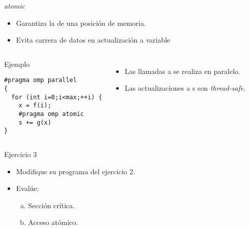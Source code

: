 \begin{frame}[t,fragile]{\emph{atomic}}
\begin{itemize}
  \item Garantiza la  de una posición de memoria.
  \item Evita carrera de datos en actualización a variable
\end{itemize}

\begin{columns}

\begin{block}{Ejemplo}
\begin{lstlisting}
#pragma omp parallel
{
  for (int i=0;i<max;++i) {
    x = f(i);
    #pragma omp atomic
    s += g(x)
}
\end{lstlisting}
\end{block}

\begin{itemize}
  \item Las llamadas a  se realiza en paralelo.
  \item Las actualizaciones a s son \emph{thread-safe}.
\end{itemize}

\end{columns}
\end{frame}

\begin{frame}[t]{Ejercicio 3}
\begin{itemize}
  \item Modifique su programa del ejercicio 2.
  \item Evalúe:
    \begin{enumerate}[a)]
      \item Sección crítica.
      \item Acceso atómico.
    \end{enumerate}
\end{itemize}
\end{frame}
